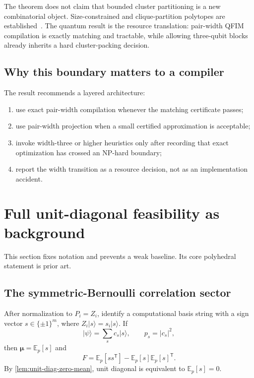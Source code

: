 \documentclass[11pt]{article}
\theoremstyle{definition}
\theoremstyle{remark}
\newcommand{\ket}[1]{\lvert #1\rangle}
\begin{document}
\begin{claimbox}[title={Interpretation of the boundary}]
The theorem does not claim that bounded cluster partitioning is a new combinatorial object. Size-constrained and clique-partition polytopes are established~\cite{GrotschelWakabayashi1990,LabbeOzsoy2010}. The quantum result is the resource translation: pair-width QFIM compilation is exactly matching and tractable, while allowing three-qubit blocks already inherits a hard cluster-packing decision.
\end{claimbox}

\subsection{Why this boundary matters to a compiler}
The result recommends a layered architecture:
\begin{enumerate}[label=(\roman*)]
  \item use exact pair-width compilation whenever the matching certificate passes;
  \item use pair-width projection when a small certified approximation is acceptable;
  \item invoke width-three or higher heuristics only after recording that exact optimization has crossed an NP-hard boundary;
  \item report the width transition as a resource decision, not as an implementation accident.
\end{enumerate}

\section{Full unit-diagonal feasibility as background}

This section fixes notation and prevents a weak baseline. Its core polyhedral statement is prior art.

\subsection{The symmetric-Bernoulli correlation sector}
After normalization to $P_i=Z_i$, identify a computational basis string with a sign vector $s\in\{\pm1\}^m$, where $Z_i\ket{s}=s_i\ket{s}$. If
\begin{equation}
  \ket{\psi}=\sum_s c_s\ket{s},
  \qquad p_s=|c_s|^2,
\end{equation}
then $\bm\mu=\mathbb E_p[s]$ and
\begin{equation}
  F=\mathbb E_p[ss^{\mathsf T}]-\mathbb E_p[s]\mathbb E_p[s]^{\mathsf T}.
  \label{eq:sign-covariance}
\end{equation}
By \cref{lem:unit-diag-zero-mean}, unit diagonal is equivalent to $\mathbb E_p[s]=0$.
\end{document}
